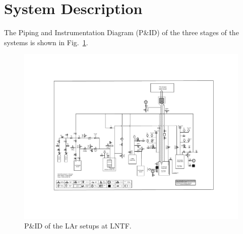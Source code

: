 \section{System Description}
\label{sec:system}

The Piping and Instrumentation Diagram (P\&ID) of the three stages
of the systems is shown in Fig.~\ref{fig:PID}.

\begin{figure}[h]
    \centering
    \includegraphics[width=\textwidth]{fig/PID_SLArchettoPAAS_v9.5.pdf}
    \caption{P\&ID of the LAr setups at LNTF.}
    \label{fig:PID}
\end{figure}

